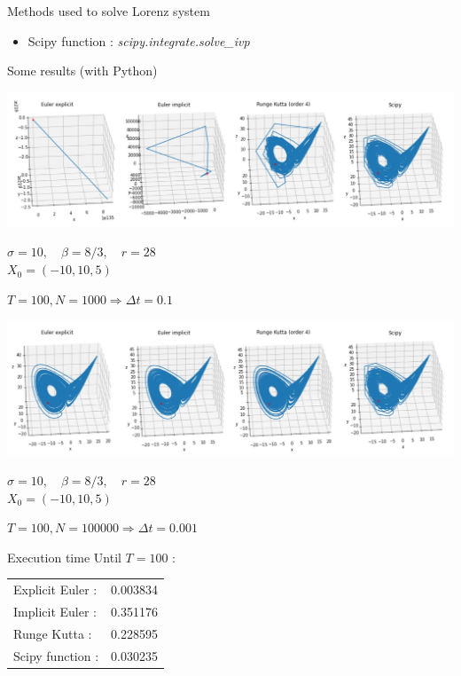 \documentclass[10pt,xcolor={table,dvipsnames},t]{beamer}
\begin{document}
\begin{frame}[allowframebreaks]{Methods used to solve Lorenz system}
\begin{itemize}
			\item Scipy function : \qquad \textit{scipy.integrate.solve\_ivp}
		\end{itemize}
		
	\end{frame}
	
	\begin{frame}[allowframebreaks]{Some results (with Python)}
		
		\includegraphics[width=\textwidth]{images/N1000.png} \\ 
		\begin{center}
			\begin{minipage}[c]{0.5\linewidth}
				$\sigma=10,\quad \beta=8/3, \quad r=28$ \\
				$X_0=(-10,10,5)$ 
			\end{minipage}
			$T=100, N = 1000 \Rightarrow \Delta t=0.1$
		\end{center}
		
		\newpage
		
		\includegraphics[width=\textwidth]{images/N100000.png} \\ 
		\begin{center}
			\begin{minipage}[c]{0.5\linewidth}
				$\sigma=10,\quad \beta=8/3, \quad r=28$ \\
				$X_0=(-10,10,5)$ 
			\end{minipage}
			$T=100, N = 100000 \Rightarrow \Delta t=0.001$
		\end{center}
		
		\newpage
		
		\begin{block}{Execution time}
			Until $T=100$ : \\
			\begin{center}
				\begin{tabular}{ll}
					Explicit Euler :&  0.003834 \\
					Implicit Euler :&  0.351176 \\
					Runge Kutta :& 0.228595 \\
					Scipy function :&  0.030235
				\end{tabular}
			\end{center}
		\end{block}
		
	\end{frame}
	
\end{document}
